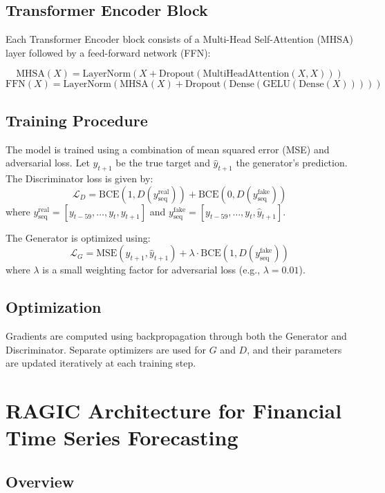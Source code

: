 \subsection{Transformer Encoder Block}

\begingroup
\sloppy
Each Transformer Encoder block consists of a Multi-Head Self-Attention (MHSA) layer followed by a feed-forward network (FFN):
\endgroup

\[
\text{MHSA}(X) = \text{LayerNorm}(X + \text{Dropout}(\text{MultiHeadAttention}(X, X)))
\]
\[
\text{FFN}(X) = \text{LayerNorm}(\text{MHSA}(X) + \text{Dropout}(\text{Dense}(\text{GELU}(\text{Dense}(X)))))
\]

\subsection{Training Procedure}

The model is trained using a combination of mean squared error (MSE) and adversarial loss. Let $y_{t+1}$ be the true target and $\hat{y}_{t+1}$ the generator's prediction. The Discriminator loss is given by:
\[
\mathcal{L}_D = \text{BCE}(1, D(y_{\text{seq}}^{\text{real}})) + \text{BCE}(0, D(y_{\text{seq}}^{\text{fake}}))
\]
where $y_{\text{seq}}^{\text{real}} = [y_{t-59}, \dots, y_t, y_{t+1}]$ and $y_{\text{seq}}^{\text{fake}} = [y_{t-59}, \dots, y_t, \hat{y}_{t+1}]$.

The Generator is optimized using:
\[
\mathcal{L}_G = \text{MSE}(y_{t+1}, \hat{y}_{t+1}) + \lambda \cdot \text{BCE}(1, D(y_{\text{seq}}^{\text{fake}}))
\]
where $\lambda$ is a small weighting factor for adversarial loss (e.g., $\lambda = 0.01$).

\subsection{Optimization}

Gradients are computed using backpropagation through both the Generator and Discriminator. Separate optimizers are used for $G$ and $D$, and their parameters are updated iteratively at each training step.

\section{RAGIC Architecture for Financial Time Series Forecasting}

\subsection{Overview}

